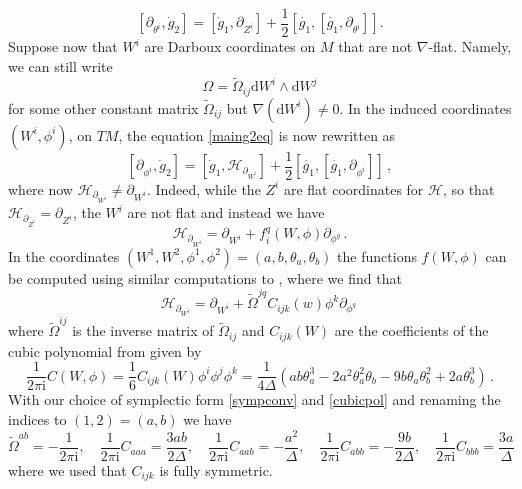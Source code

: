 \documentclass{article}
\theoremstyle{definition}
\numberwithin{equation}{section}
\begin{document}
\begin{equation}\label{maing2eq}
        [\partial_{\theta^i},\dot{g}_2]=[\dot{g}_1,\partial_{Z^i}]+\frac{1}{2}[\dot{g_1},[\dot{g_1},\partial_{\theta^i}]].
\end{equation}
Suppose now that $W^i$ are Darboux coordinates on $M$ that are not $\nabla$-flat. Namely, we can still write
\begin{equation*}
    \Omega=\widetilde{\Omega}_{ij}\mathrm{d}W^i\wedge \mathrm{d}W^j
\end{equation*}
for some other constant matrix $\widetilde{\Omega}_{ij}$ but $\nabla (\mathrm{d}W^i)\neq 0$. In the induced coordinates $(W^i,\phi^i)$, on $TM$, the equation \eqref{maing2eq} is now rewritten as
\begin{equation}\label{g2eqothercoords}
        [\partial_{\phi^i},\dot{g}_2]=[\dot{g}_1,\mathcal{H}_{\partial_{W^i}}]+\frac{1}{2}[\dot{g_1},[\dot{g_1},\partial_{\phi^i}]]\,,
\end{equation}
where now $\mathcal{H}_{\partial_{W^i}}\neq \partial_{W^i}$. Indeed, while the $Z^i$ are flat coordinates for $\mathcal{H}$, so that $\mathcal{H}_{\partial_{Z^i}}=\partial_{Z^i}$, the $W^i$ are not flat and instead we have
\begin{equation}
    \mathcal{H}_{\partial_{W^i}}=\partial_{W^i}+f_i^q(W,\phi)\partial_{\phi^q}\,.
\end{equation}
In the coordinates $(W^1,W^2,\phi^1,\phi^2)=(a,b,\theta_a,\theta_b)$ the functions $f(W,\phi)$ can be computed using similar computations to \cite[Section 4.2]{BridgelandOsc}, where we find that 
\begin{equation}\label{horliftid}
    \mathcal{H}_{\partial_{W^i}}=\partial_{W^i}+\widetilde{\Omega}^{jq}C_{ijk}(w)\phi^k\partial_{\phi^q}\,
\end{equation}
where $\widetilde{\Omega}^{ij}$ is the inverse matrix of $\widetilde{\Omega}_{ij}$ and $C_{ijk}(W)$ are the coefficients of the cubic polynomial from \cite[Equation (66)]{BridgelandOsc} given by
\begin{equation}\label{cubicpol}
\frac{1}{2\pi \mathrm{i}}C(W,\phi)=\frac{1}{6}C_{ijk}(W)\phi^i\phi^j\phi^k=\frac{1}{4\Delta}\left(ab\theta_a^3-2a^2\theta_a^2\theta_b-9b\theta_a\theta_b^2+2a\theta_b^3\right)\,.
\end{equation}
With our choice of symplectic form \eqref{sympconv} and \eqref{cubicpol} and renaming the indices to $(1,2)=(a,b)$ we have
\begin{equation}\label{usefulid3}
    \widetilde{\Omega}^{ab}=-\frac{1}{2\pi \mathrm{i}}, \quad \frac{1}{2\pi \mathrm{i}}C_{aaa}=\frac{3ab}{2\Delta}, \quad \frac{1}{2\pi \mathrm{i}}C_{aab}=-\frac{a^2}{\Delta}, \quad \frac{1}{2\pi \mathrm{i}}C_{abb}=-\frac{9b}{2\Delta}, \quad \frac{1}{2\pi \mathrm{i}}C_{bbb}=\frac{3a}{\Delta}\,
\end{equation}
where we used that $C_{ijk}$ is fully symmetric. \\
\end{document}
